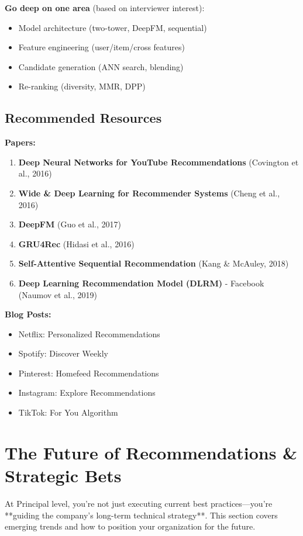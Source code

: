 \documentclass[10pt]{article}
\begin{document}
\textbf{Go deep on one area} (based on interviewer interest):
\begin{itemize}
\item Model architecture (two-tower, DeepFM, sequential)
\item Feature engineering (user/item/cross features)
\item Candidate generation (ANN search, blending)
\item Re-ranking (diversity, MMR, DPP)
\end{itemize}

\subsection{Recommended Resources}

\textbf{Papers:}
\begin{enumerate}
\item \textbf{Deep Neural Networks for YouTube Recommendations} (Covington et al., 2016)
\item \textbf{Wide \& Deep Learning for Recommender Systems} (Cheng et al., 2016)
\item \textbf{DeepFM} (Guo et al., 2017)
\item \textbf{GRU4Rec} (Hidasi et al., 2016)
\item \textbf{Self-Attentive Sequential Recommendation} (Kang \& McAuley, 2018)
\item \textbf{Deep Learning Recommendation Model (DLRM)} - Facebook (Naumov et al., 2019)
\end{enumerate}

\textbf{Blog Posts:}
\begin{itemize}
\item Netflix: Personalized Recommendations
\item Spotify: Discover Weekly
\item Pinterest: Homefeed Recommendations
\item Instagram: Explore Recommendations
\item TikTok: For You Algorithm
\end{itemize}

\section{The Future of Recommendations \& Strategic Bets}

At Principal level, you're not just executing current best practices—you're **guiding the company's long-term technical strategy**. This section covers emerging trends and how to position your organization for the future.
\end{document}
